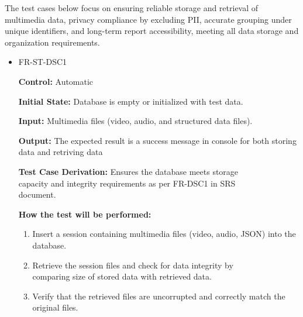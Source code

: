 \documentclass[12pt, titlepage]{article}
\begin{document}
\hspace{2em}The test cases below focus on ensuring reliable storage and retrieval 
of multimedia data, privacy compliance by excluding PII, accurate grouping under 
unique identifiers, and long-term report accessibility, meeting all data storage 
and organization requirements.
\begin{itemize}
  \item FR-ST-DSC1
  \begin{mdframed}[linewidth=0.5mm]
      \textbf{Control:} Automatic \par
      \textbf{Initial State:} Database is empty or initialized with test data. \par
      \textbf{Input:} Multimedia files (video, audio, and structured data files). \par
      \textbf{Output:} The expected result is a success message in console for both storing data and retriving data \par
      \textbf{Test Case Derivation:} Ensures the database meets storage \\capacity and integrity requirements as per FR-DSC1 in SRS \\document. \par
      \textbf{How the test will be performed:}
      \begin{enumerate}[noitemsep]
        \item Insert a session containing multimedia files (video, audio, JSON) into the database.
        \item Retrieve the session files and check for data integrity by \\comparing size of stored data with retrieved data.
        \item Verify that the retrieved files are uncorrupted and correctly match the original files.
      \end{enumerate}
  \end{mdframed}


\end{itemize}
\end{document}
